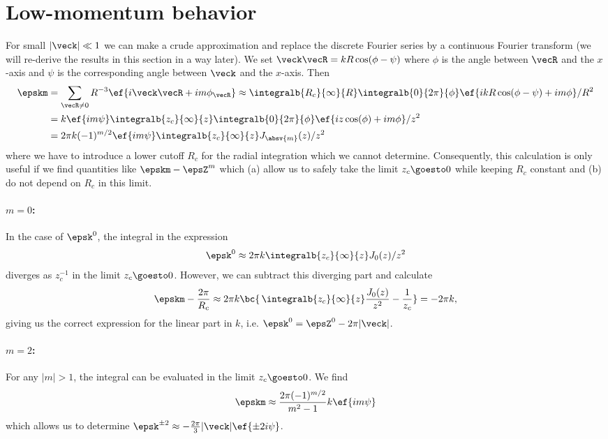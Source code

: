 \section{Low-momentum behavior}
For small $|\veck| \ll 1$ we can make a crude approximation and replace the discrete Fourier series
by a continuous Fourier transform (we will re-derive the results in this section in a  way later). We set $\veck\vecR = k R \cos(\phi-\psi)$ where
$\phi$ is the angle between $\vecR$ and the $x$-axis and $\psi$ is the
corresponding angle between $\veck$ and the $x$-axis. Then
\begin{align}
    \epskm &= \sum_{\vecR\ne 0} R^{-3} \ef{i\veck\vecR+i m \phi_\vecR}
    \approx \integralb{R_c}{\infty}{R} \integralb{0}{2\pi}{\phi} \ef{ikR \cos(\phi-\psi) + i m \phi} / R^2\\
    &= k \ef{im \psi} \integralb{z_c}{\infty}{z} \integralb{0}{2\pi}{\phi} \ef{i z \cos(\phi) + i m \phi} / z^2\\
    &= 2\pi k (-1)^{m/2} \ef{i m \psi} \integralb{z_c}{\infty}{z} J_{\absv{m}}(z)/z^2
\end{align}
where we have to introduce a lower cutoff $R_c$ for the radial integration which
we cannot determine. Consequently, this calculation is only useful
if we find quantities like $\epskm-\epsZ^m$ which (a) allow
us to safely take the limit $z_c \goesto 0$ while keeping $R_c$ constant and
(b) do not depend on $R_c$ in this limit.

\paragraph{$m=0$:} In the case of $\epsk^0$, the integral in the expression
\begin{align}
    \epsk^0 \approx 2\pi k \integralb{z_c}{\infty}{z} J_0(z)/z^2
\end{align}
diverges as $z_c^{-1}$ in the limit $z_c \goesto 0$. However, we can subtract this diverging part and calculate
\begin{align}
    \epskm - \frac{2\pi}{R_c} \approx 2\pi k \bc{ \, \integralb{z_c}{\infty}{z} \frac{J_0(z)}{z^2} - \frac{1}{z_c} } = -2\pi k,
\end{align}
giving us the correct expression for the linear part in $k$, i.e. $\epsk^0=\epsZ^0 - 2\pi |\veck|$.

\paragraph{$m=2$:} For any $|m|>1$, the integral can be evaluated in the limit $z_c\goesto 0$. We find
\begin{align}
    \epskm \approx \frac{2\pi (-1)^{m/2}}{m^2-1} k \ef{im \psi}
\end{align}
which allows us to determine $\epsk^{\pm 2} \approx -\frac{2\pi}{3} |\veck| \ef{\pm 2 i \psi}$.

